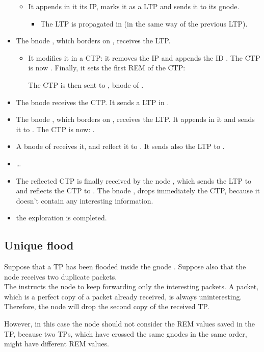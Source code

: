 \documentclass[a4paper]{article}
\begin{document}
\begin{itemize}
	\begin{itemize}
		\item It appends in it its IP, marks it as a LTP and sends it to its gnode.
			\begin{itemize}
				\item The LTP is propagated in  (in the same way of the
					previous LTP).
			\end{itemize}
	\end{itemize}
\item The bnode , which borders on , receives the LTP.
	\begin{itemize}
		\item It modifies it in a CTP: it removes the IP 
			and appends the ID . The CTP is now . Finally, it sets the first REM of the CTP:
			
			The CTP is then sent to , bnode of .
	\end{itemize}
\item The bnode  receives the CTP. It sends a LTP in .
\item The bnode , which borders on , receives the LTP. It 
	appends  in it and sends it to . The CTP is now: .
\item A bnode of  receives it, and reflect it to . It sends also the
	LTP to .
\item \dots
\item The reflected CTP is finally received by the node , which
	sends the LTP to  and reflects the CTP to . The bnode
	, drops immediately the CTP, because it doesn't contain any
	interesting information.
\item the exploration is completed.
\end{itemize}




\subsection{Unique flood}
Suppose that a TP has been flooded inside the gnode .
Suppose also that the node  receives two duplicate packets.\\
The  instructs the node  to keep forwarding only the interesting packets.
A packet, which is a perfect copy of a packet already received, is always
uninteresting. Therefore, the node  will drop the second copy of the
received TP. 

However, in this case the node  should not consider the REM
values saved in the TP, because two TPs, which have crossed the same
gnodes in the same order, might have different REM values.
\\
\end{document}
